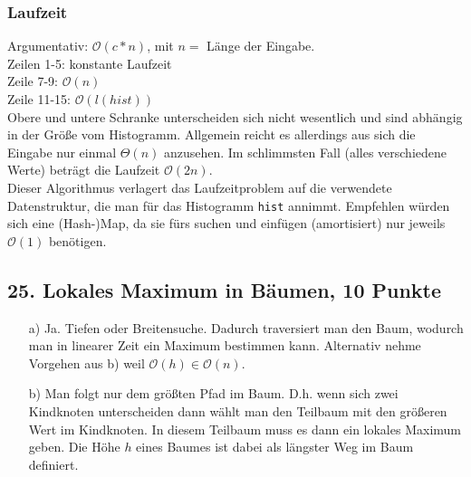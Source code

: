 \documentclass[ngerman,a4paper]{report}
\begin{document}
\begin{enumerate}
\subsubsection*{Laufzeit}
Argumentativ: $\mathcal{O}(c*n)$, mit $n=$ Länge der Eingabe.\\
Zeilen 1-5: konstante Laufzeit\\
Zeile 7-9: $\mathcal{O}(n)$\\
Zeile 11-15: $\mathcal{O}(l(hist))$\\

Obere und untere Schranke unterscheiden sich nicht wesentlich und sind abhängig in der Größe vom Histogramm. Allgemein reicht es allerdings aus sich die Eingabe nur einmal $\Theta(n)$ anzusehen. Im schlimmsten Fall (alles verschiedene Werte) beträgt die Laufzeit $\mathcal{O}(2n)$.\\
Dieser Algorithmus verlagert das Laufzeitproblem auf die verwendete Datenstruktur, die man für das Histogramm \lstinline!hist! annimmt. Empfehlen würden sich eine (Hash-)Map, da sie fürs suchen und einfügen (amortisiert) nur jeweils $\mathcal{O}(1)$ benötigen.
\end{enumerate}

\subsection*{25. Lokales Maximum in Bäumen, 10 Punkte}
\begin{enumerate}
\item[a)] Ja. Tiefen oder Breitensuche. Dadurch traversiert man den Baum, wodurch man in linearer Zeit ein Maximum bestimmen kann. Alternativ nehme Vorgehen aus b) weil $\mathcal{O}(h) \in \mathcal{O}(n)$.
\item[b)] Man folgt nur dem größten Pfad im Baum. D.h. wenn sich zwei Kindknoten unterscheiden dann wählt man den Teilbaum mit den größeren Wert im Kindknoten. In diesem Teilbaum muss es dann ein lokales Maximum geben. Die Höhe $h$ eines Baumes ist dabei als längster Weg im Baum definiert. 
\end{enumerate}
\end{document}
